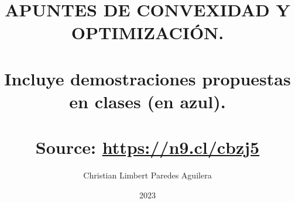 \title{APUNTES DE CONVEXIDAD Y OPTIMIZACIÓN. \\ \hfill\\ \large  Incluye demostraciones propuestas en clases ({\color{blue}en azul}).\\\hfill \\ \small Source: \url{https://n9.cl/cbzj5}}
\author{Christian Limbert Paredes Aguilera}
\date{2023}
